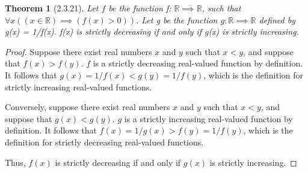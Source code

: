 \documentclass[a4paper, 12pt]{article}
\theoremstyle{plain}
\newtheorem*{theorem*}{Theorem}
\begin{document}
	
	\begin{theorem*}[2.3.21]
		Let $f$ be the function f: $\mathbb{R} \implies \mathbb{R}$, such that \newline 
		$\forall x ((x \in \mathbb{R}) \implies (f(x) > 0))$. Let g be the function 
		$g: \mathbb{R} \implies \mathbb{R}$ defined by g(x) = 1/f(x). f(x) is strictly decreasing 
		if and only if g(x) is strictly increasing.
	\end{theorem*}
	
	\begin{proof}
		Suppose there exist real numbers $x$ and $y$ such that $x < y$, and suppose that 
		$f(x) > f(y)$. $f$ is a strictly decreasing real-valued function by definition. It follows 
		that $g(x) = 1/f(x) < g(y) = 1/f(y)$, which is the definition for strictly increasing 
		real-valued functions.
		
		Conversely, suppose there exist real numbers $x$ and $y$ such that $x < y$, and suppose that 
		$g(x) < g(y)$. $g$ is a strictly increasing real-valued function by definition. It follows 
		that $f(x) = 1/g(x) > f(y) = 1/f(y)$, which is the definition for strictly decreasing 
		real-valued functions.
		
		Thus, $f(x)$ is strictly decreasing if and only if $g(x)$ is strictly increasing.
	\end{proof}
\end{document}
